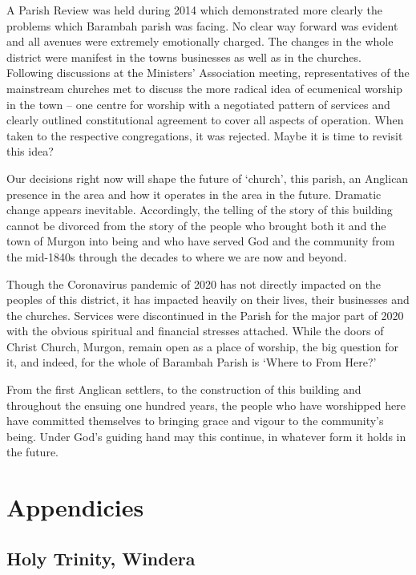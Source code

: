 A Parish Review was held during 2014 which demonstrated more clearly the problems which Barambah parish was facing. No clear way forward was evident and all avenues were extremely emotionally charged. The changes in the whole district were manifest in the towns businesses as well as in the churches. Following discussions at the Ministers' Association meeting, representatives of the mainstream churches met to discuss the more radical idea of ecumenical worship in the town -- one centre for worship with a negotiated pattern of services and clearly outlined constitutional agreement to cover all aspects of operation. When taken to the respective congregations, it was rejected. Maybe it is time to revisit this idea?

Our decisions right now will shape the future of `church', this parish, an Anglican presence in the area and how it operates in the area in the future. Dramatic change appears inevitable. Accordingly, the telling of the story of this building cannot be divorced from the story of the people who brought both it and the town of Murgon into being and who have served God and the community from the mid-1840s through the decades to where we are now and beyond.

Though the Coronavirus pandemic of 2020 has not directly impacted on the peoples of this district, it has impacted heavily on their lives, their businesses and the churches. Services were discontinued in the Parish for the major part of 2020 with the obvious spiritual and financial stresses attached. While the doors of Christ Church, Murgon, remain open as a place of worship, the big question for it, and indeed, for the whole of Barambah Parish is `Where to From Here?'

From the first Anglican settlers, to the construction of this building and throughout the ensuing one hundred years, the people who have worshipped here have committed themselves to bringing grace and vigour to the community's being. Under God's guiding hand may this continue, in whatever form it holds in the future.

\hypertarget{appendicies}{%
\chapter{Appendicies}\label{appendicies}}

\hypertarget{holy-trinity-windera-1}{%
\section{Holy Trinity, Windera}\label{holy-trinity-windera-1}}

